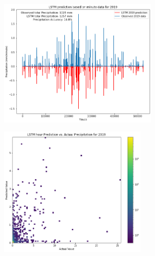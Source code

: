 \documentclass[11pt]{report}
\begin{document}
\begin{figure}[bh!]
	\centering
	\includegraphics[width = 0.7\textwidth]{Figures/LSTM_minute.png}
	\caption[Comparing LSTM results to observed precipitation in 2019 by minute]{\label{LSTM_minute}
	}
\end{figure}
\clearpage
\begin{figure}[th!]
	\centering
	\includegraphics[width = 0.65\textwidth]{Figures/LSTM_hour_compare.png}
	\caption[LSTM hour prediction vs. actual data]{
	}
\end{figure}
\end{document}
